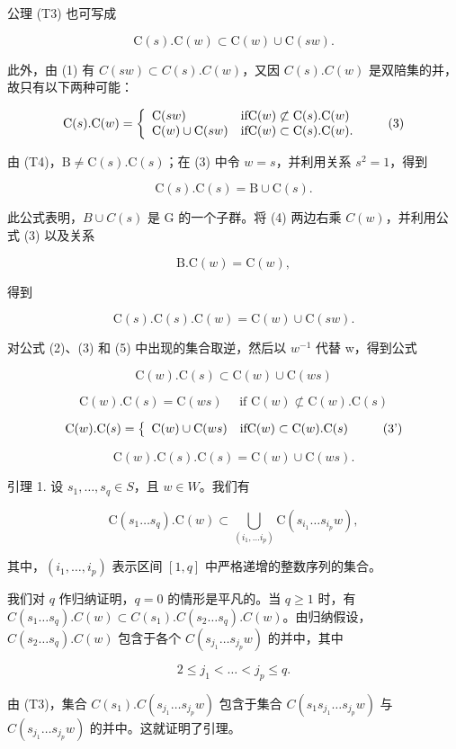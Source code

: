 公理 (T3) 也可写成

\[
\mathrm{C} (s). \mathrm{C} (w) \subset \mathrm{C} (w) \cup \mathrm{C} (s w).\tag{2}
\]

此外，由 (1) 有 \(C(sw) \subset C(s).C(w)\)，又因 \(C(s).C(w)\) 是双陪集的并，故只有以下两种可能：

\[
\mathrm{C} (s). \mathrm{C} (w) = \left\{ \begin{array}{l l} \mathrm{C} (s w) & \text {if} \mathrm{C} (w) \not \subset \mathrm{C} (s). \mathrm{C} (w) \\ \mathrm{C} (w) \cup \mathrm{C} (s w) & \text {if} \mathrm{C} (w) \subset \mathrm{C} (s). \mathrm{C} (w). \end{array} \right.\tag{3}
\]

由 (T4)，\(\mathrm{B} \neq \mathrm{C}(s). \mathrm{C}(s)\)；在 (3) 中令 \(w = s\)，并利用关系 \(s^2 = 1\)，得到

\[
\mathrm{C} (s). \mathrm{C} (s) = \mathrm{B} \cup \mathrm{C} (s).\tag{4}
\]

此公式表明，\(B \cup C(s)\) 是 G 的一个子群。将 (4) 两边右乘 \(C(w)\)，并利用公式 (3) 以及关系

\[
\mathrm{B.C} (w) = \mathrm{C} (w),
\]

得到

\[
\mathrm{C} (s). \mathrm{C} (s). \mathrm{C} (w) = \mathrm{C} (w) \cup \mathrm{C} (s w).\tag{5}
\]

对公式 (2)、(3) 和 (5) 中出现的集合取逆，然后以 \(w^{-1}\) 代替 w，得到公式

\[
\mathrm{C} (w). \mathrm{C} (s) \subset \mathrm{C} (w) \cup \mathrm{C} (w s)\tag{(2')}
\]

\[
\mathrm{C} (w). \mathrm{C} (s) = \mathrm{C} (w s) \quad \text {   if   } \mathrm{C} (w) \not \subset \mathrm{C} (w). \mathrm{C} (s)
\]

\[
\mathrm{C} (w). \mathrm{C} (s) = \left\{ \begin{array}{l l} \mathrm{C} (w) \cup \mathrm{C} (w s) & \text {if} \mathrm{C} (w) \subset \mathrm{C} (w). \mathrm{C} (s) \end{array} \right.\tag{3'}
\]

\[
\mathrm{C} (w). \mathrm{C} (s). \mathrm{C} (s) = \mathrm{C} (w) \cup \mathrm{C} (w s).\tag{(5')}
\]

引理 1. 设 \(s_1, \ldots, s_q \in S\)，且 \(w \in W\)。我们有

\[
\mathrm{C} \left(s _ {1} \dots s _ {q}\right). \mathrm{C} (w) \subset \bigcup_ {\left(i _ {1}, \dots i _ {p}\right)} \mathrm{C} \left(s _ {i _ {1}} \dots s _ {i _ {p}} w\right),
\]

其中，\((i_1, \ldots, i_p)\) 表示区间 \([1, q]\) 中严格递增的整数序列的集合。

我们对 \(q\) 作归纳证明，\(q = 0\) 的情形是平凡的。当 \(q \geqslant 1\) 时，有 \(C(s_1 \ldots s_q).C(w) \subset C(s_1).C(s_2 \ldots s_q).C(w)\)。由归纳假设，\(C(s_2 \ldots s_q).C(w)\) 包含于各个 \(C(s_{j_1} \ldots s_{j_p}w)\) 的并中，其中

\[
2 \leqslant j _ {1} <   \dots <   j _ {p} \leqslant q.
\]

由 (T3)，集合 \(C(s_{1}).C(s_{j_{1}}\ldots s_{j_{p}}w)\) 包含于集合 \(C(s_{1}s_{j_{1}}\ldots s_{j_{p}}w)\) 与 \(C(s_{j_{1}}\ldots s_{j_{p}}w)\) 的并中。这就证明了引理。

